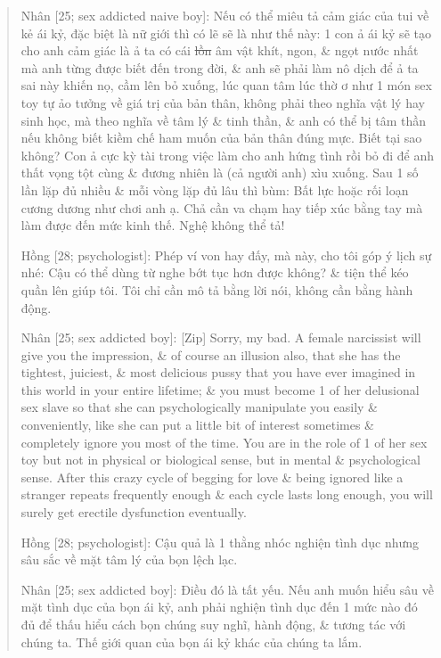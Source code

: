\documentclass[12pt]{article}
\begin{document}
\begin{quote}
	{\sf Nhân [25; sex addicted naive boy]:} Nếu có thể miêu tả cảm giác của tui về kẻ ái kỷ, đặc biệt là nữ giới thì có lẽ sẽ là như thế này: 1 con ả ái kỷ sẽ tạo cho anh cảm giác là ả ta có cái \st{lồn} âm vật khít, ngon, \& ngọt nước nhất mà anh từng được biết đến trong đời, \& anh sẽ phải làm nô dịch để ả ta sai này khiến nọ, cầm lên bỏ xuống, lúc quan tâm lúc thờ ơ như 1 món sex toy tự ảo tưởng về giá trị của bản thân, không phải theo nghĩa vật lý hay sinh học, mà theo nghĩa về tâm lý \& tinh thần, \& anh có thể bị tâm thần nếu không biết kiềm chế ham muốn của bản thân đúng mực. Biết tại sao không? Con ả cực kỳ tài trong việc làm cho anh hứng tình rồi bỏ đi để anh thất vọng tột cùng \& đương nhiên là (cả người anh) xìu xuống. Sau 1 số lần lặp đủ nhiều \& mỗi vòng lặp đủ lâu thì bùm: Bất lực hoặc rối loạn cương dương như chơi anh ạ. Chả cần va chạm hay tiếp xúc bằng tay mà làm được đến mức kinh thế. Nghệ không thể tả!
	
	{\sf Hồng [28; psychologist]:} Phép ví von hay đấy, mà này, cho tôi góp ý lịch sự nhé: Cậu có thể dùng từ nghe bớt tục hơn được không? \& tiện thể kéo quần lên giúp tôi. Tôi chỉ cần mô tả bằng lời nói, không cần bằng hành động.
	
	{\sf Nhân [25; sex addicted boy]:} [Zip] Sorry, my bad. A female narcissist will give you the impression, \& of course an illusion also, that she has the tightest, juiciest, \& most delicious pussy that you have ever imagined in this world in your entire lifetime; \& you must become 1 of her delusional sex slave so that she can psychologically manipulate you easily \& conveniently, like she can put a little bit of interest sometimes \& completely ignore you most of the time. You are in the role of 1 of her sex toy but not in physical or biological sense, but in mental \& psychological sense. After this crazy cycle of begging for love \& being ignored like a stranger repeats frequently enough \& each cycle lasts long enough, you will surely get erectile dysfunction eventually.
	
	{\sf Hồng [28; psychologist]:} Cậu quả là 1 thằng nhóc nghiện tình dục nhưng sâu sắc về mặt tâm lý của bọn lệch lạc.
	
	{\sf Nhân [25; sex addicted boy]:} Điều đó là tất yếu. Nếu anh muốn hiểu sâu về mặt tình dục của bọn ái kỷ, anh phải nghiện tình dục đến 1 mức nào đó đủ để thấu hiểu cách bọn chúng suy nghĩ, hành động, \& tương tác với chúng ta. Thế giới quan của bọn ái kỷ khác của chúng ta lắm.
\end{quote}
\end{document}
